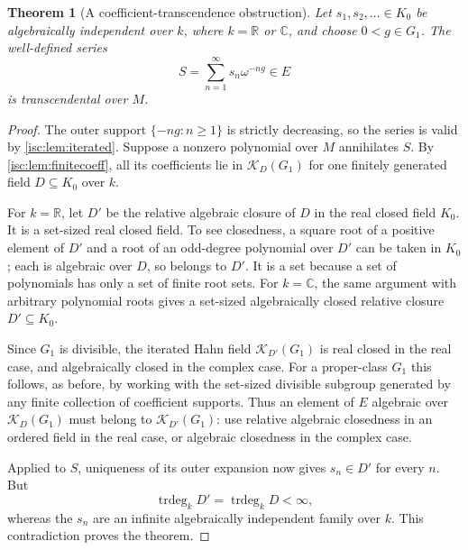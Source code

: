 \documentclass[11pt,letterpaper]{article}
\newtheorem{theorem}{Theorem}[section]
\theoremstyle{definition}
\theoremstyle{remark}
\newcommand{\R}{\mathbb R}
\newcommand{\C}{\mathbb C}
\newcommand{\K}[2]{\mathcal K_{#1}(#2)}
\newcommand{\trdeg}{\operatorname{trdeg}}
\numberwithin{equation}{section}
\begin{document}
\begin{theorem}[A coefficient-transcendence obstruction]\label{isc:thm:joinobstruction}
Let $s_1,s_2,\ldots\in K_0$ be algebraically independent over $k$, where
$k=\R$ or $\C$, and choose $0<g\in G_1$. The well-defined series
\[
 S=\sum_{n=1}^{\infty}s_n\omega^{-ng}\in E
\]
is transcendental over $M$.
\end{theorem}
\begin{proof}
The outer support $\{-ng:n\ge1\}$ is strictly decreasing, so the series
is valid by \cref{isc:lem:iterated}. Suppose a nonzero polynomial over $M$
annihilates $S$. By \cref{isc:lem:finitecoeff}, all its coefficients lie in
$\K{D}{G_1}$ for one finitely generated field $D\subseteq K_0$ over $k$.

For $k=\R$, let $D'$ be the relative algebraic closure of $D$ in the real
closed field $K_0$. It is a set-sized real closed field. To see closedness,
a square root of a positive element of $D'$ and a root of an odd-degree
polynomial over $D'$ can be taken in $K_0$; each is algebraic over $D$,
so belongs to $D'$. It is a set because a set of polynomials has only a
set of finite root sets. For $k=\C$, the same argument with arbitrary
polynomial roots gives a set-sized algebraically closed relative closure
$D'\subseteq K_0$.

Since $G_1$ is divisible, the iterated Hahn field $\K{D'}{G_1}$ is real
closed in the real case, and algebraically closed in the complex case. For
a proper-class $G_1$ this follows, as before, by working with the set-sized
divisible subgroup generated by any finite collection of coefficient
supports. Thus an element of $E$ algebraic over $\K{D}{G_1}$ must belong
to $\K{D'}{G_1}$: use relative algebraic closedness in an ordered field
in the real case, or algebraic closedness in the complex case.

Applied to $S$, uniqueness of its outer expansion now gives $s_n\in D'$
for every $n$. But
\[
 \trdeg_kD'=\trdeg_kD<\infty,
\]
whereas the $s_n$ are an infinite algebraically independent family over
$k$. This contradiction proves the theorem.
\end{proof}
\end{document}
